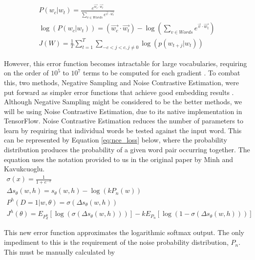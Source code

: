 \documentclass[pageno]{jpaper}
\begin{document}
\begin{subequations}
\label{eq:softembed}
\begin{gather}
P(w_{c} \vert w_{t}) = \frac{e^{\vec{w_{c}} \cdot \vec{w_{t}}}}{\sum_{v \in Words} e^{\vec{v} \cdot \vec{w_{t}}}}\\
\log(P(w_{c} \vert w_{t})) = \left(\vec{w_{c}} \cdot \vec{w_{t}}\right) - \log\left( \sum_{v \in Words} e^{\vec{v} \cdot \vec{w_{t}}} \right) \\
J(W) = \frac{1}{T} \sum_{t = 1}^{T} \sum_{-c < j < c, j \neq 0} \log(p(w_{t + j} \vert w_{t}))
\end{gather}
\end{subequations}

However, this error function becomes intractable for large vocabularies, requiring on the order of $10^{5}$ to $10^{7}$ terms to be computed for each gradient \cite{mikolov:2013:2}.  To combat this, two methods, Negative Sampling and Noise Contrastive Estimation, were put forward as simpler error functions that achieve good embedding results \cite{mnih:2013}.  Although Negative Sampling might be considered to be the better methods, we will be using Noise Contrastive Estimation, due to its native implementation in TensorFlow.  Noise Contrastive Estimation reduces the number of parameters to learn by requiring that individual words be tested against the input word.  This can be represented by Equation \ref{eq:nce_loss} below, where the probability distribution produces the probability of a given word pair occurring together.  The equation uses the notation provided to us in the original paper by Minh and Kavukcuoglu.
\begin{subequations}
	\label{eq:nce_loss}
	\begin{gather}
	\sigma(x) = \frac{1}{1 + e^{-x}} \\
	\Delta s_{\theta}(w, h) = s_{\theta}(w, h) - \log(k P_{n}(w))\\
	P^{h}(D = 1 \vert w, \theta) = \sigma\left(\Delta s_{\theta}(w,h)\right)\\
	J^{h}(\theta) = E_{P^{h}_{d}}\left[\log \left(\sigma\left(\Delta s_{\theta}(w,h)\right)\right)\right] - kE_{P_{n}}\left[\log \left(1 - \sigma\left(\Delta s_{\theta}(w,h)\right)\right)\right]
	\end{gather}
\end{subequations}

This new error function approximates the logarithmic softmax output.  The only impediment to this is the requirement of the noise probability distribution, $P_{n}$.  This must be manually calculated by 
\end{document}
